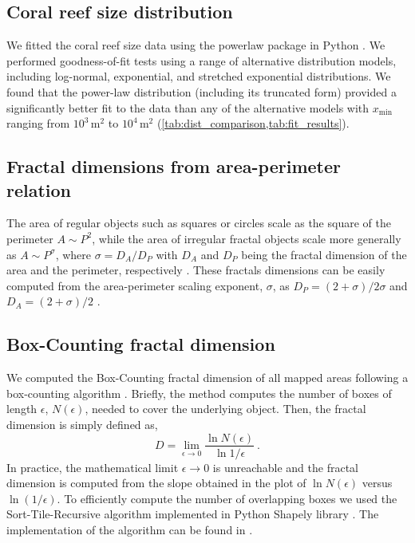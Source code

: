 \subsection{Coral reef size distribution}

We fitted the coral reef size data using the powerlaw package in Python
\cite{powerlaw, Clauset2009}. We performed goodness-of-fit tests using a range
of alternative distribution models, including log-normal, exponential, and
stretched exponential distributions. We found that the power-law distribution
(including its truncated form) provided a significantly better fit to the data
than any of the alternative models with $x_{\textrm{min}}$ ranging from
$10^3\,\textrm{m}^2$ to $10^4\,\textrm{m}^2$
(\cref{tab:dist_comparison,tab:fit_results}).

\subsection{Fractal dimensions from area-perimeter relation}

The area of regular objects such as squares or circles scale as the square
of the perimeter $A\sim P^2$, while the area of irregular fractal objects scale
more generally as $A\sim P^{\sigma}$, where $\sigma=D_A/D_P$ with $D_A$ and
$D_P$ being the fractal dimension of the area and the perimeter, respectively
\cite{MAN83, CHEN2013}. These fractals dimensions can be easily computed from
the area-perimeter scaling exponent, $\sigma$, as $D_P=(2+\sigma)/2\sigma$ and
$D_A=(2+\sigma)/2$ \cite{CHEN2013}.

\subsection{Box-Counting fractal dimension}

We computed the Box-Counting fractal dimension of all mapped areas
following a box-counting algorithm \cite{MAN83}. Briefly, the method computes
the number of boxes of length $\epsilon$, $N(\epsilon)$, needed to cover the
underlying object. Then, the fractal dimension is simply defined as,
\begin{equation}
    D=\lim_{\epsilon\to 0}\frac{\ln{N(\epsilon)}}{\ln{1/\epsilon}} \ .
\end{equation}
In practice, the mathematical limit $\epsilon\to 0$ is unreachable and the
fractal dimension is computed from the slope obtained in the plot of $\ln
    N(\epsilon)$ versus $\ln(1/\epsilon)$. To efficiently compute the number of
overlapping boxes we used the Sort-Tile-Recursive algorithm \cite{STRtree}
implemented in Python Shapely library \cite{shapely}. The implementation of the
algorithm can be found in \cite{CODE_corals}.

